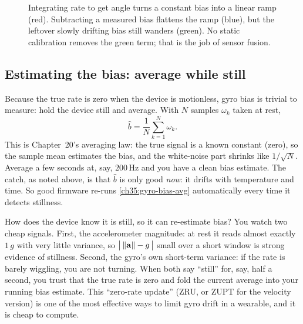 \begin{figure}[H]
\centering
{}
\caption{Integrating rate to get angle turns a constant bias into a linear ramp
(red). Subtracting a measured bias flattens the ramp (blue), but the leftover
slowly drifting bias still wanders (green). No static calibration removes the
green term; that is the job of sensor fusion.}
\label{ch35:fig-gyro-drift}
\end{figure}

\subsection{Estimating the bias: average while still}
\label{ch35:gyro-bias-estimate}

Because the true rate is zero when the device is motionless, gyro bias is trivial to measure: hold the device still and average. With $N$
samples $\omega_k$ taken at rest,
\begin{equation}
  \hat{b} = \frac{1}{N}\sum_{k=1}^{N}\omega_k.
  \label{ch35:gyro-bias-avg}
\end{equation}
This is Chapter~20's averaging law: the true
signal is a known constant (zero), so the sample mean estimates the bias, and the
white-noise part shrinks like $1/\sqrt{N}$. Average a few seconds at, say,
$200\,\mathrm{Hz}$ and you have a clean bias estimate. The catch, as noted
above, is that $\hat b$ is only good \emph{now}: it drifts with temperature
and time. So good firmware re-runs \eqref{ch35:gyro-bias-avg} automatically every
time it detects stillness.

\begin{whybox}
How does the device know it is still, so it can re-estimate bias? You watch two
cheap signals. First, the accelerometer magnitude: at rest it reads almost
exactly $1\,g$ with very little variance, so $\bigl|\,\lVert\mathbf{a}\rVert - g\,\bigr|$
small over a short window is strong evidence of stillness. Second, the gyro's own
short-term variance: if the rate is barely wiggling, you are not turning. When
both say ``still'' for, say, half a second, you trust that the true rate is zero
and fold the current average into your running bias estimate. This ``zero-rate
update'' (ZRU, or ZUPT for the velocity version) is one of the most effective
ways to limit gyro drift in a wearable, and it is cheap to compute.
\end{whybox}

